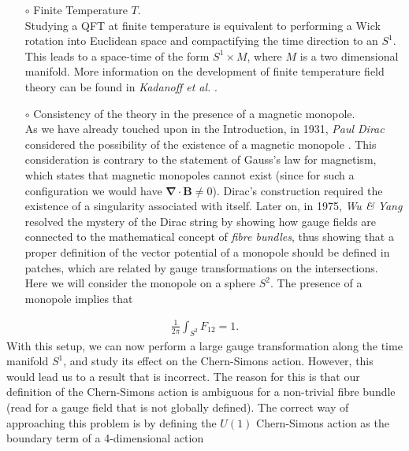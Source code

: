     \begin{itemize}
        \setlength\itemsep{1em}
        \item[$\circ$] Finite Temperature $T$.\\
            \vspace{0.01em}
            Studying a QFT at finite temperature is equivalent to performing a Wick rotation into Euclidean space and compactifying the time direction to an $S^1$. This leads to a space-time of the form $S^1 \times M$, where $M$ is a two dimensional manifold. More information on the development of finite temperature field theory can be found in \textit{Kadanoff et al.} \cite{Kadanoff2018}.
        \item[$\circ$] Consistency of the theory in the presence of a magnetic monopole.\\
            \vspace{0.01em}
            As we have already touched upon in the Introduction, in 1931, \textit{Paul Dirac} considered the possibility of the existence of a magnetic monopole \cite{Dirac:1931kp}. This consideration is contrary to the statement of Gauss's law for magnetism, which states that magnetic monopoles cannot exist (since for such a configuration we would have ${ \bm\nabla} \cdot { \bm B} \neq 0$). Dirac's construction required the existence of a singularity associated with itself. Later on, in 1975, \textit{Wu \& Yang} \cite{Wu:1975es, Wu:1976ge}  resolved the mystery of the Dirac string by showing how gauge fields are connected to the mathematical concept of \textit{fibre bundles}, thus showing that a proper definition of the vector potential of a monopole should be defined in patches, which are related by gauge transformations on the intersections. Here we will consider the monopole on a sphere $S^2$. The presence of a monopole implies that
    \end{itemize}
\begin{align}
    \frac{1}{2\pi} \int_{S^2} F_{12} = 1. \label{monopole_flux}
\end{align}
    With this setup, we can now perform a large gauge transformation along the time manifold $S^1$, and study its effect on the Chern-Simons action. However, this would lead us to a result that is incorrect. The reason for this is that our definition of the Chern-Simons action is ambiguous for a non-trivial fibre bundle (read for a gauge field that is not globally defined). The correct way of approaching this problem is by defining the $U(1)$ Chern-Simons action as the boundary term of a 4-dimensional action \cite{Dijkgraaf:1989pz}
